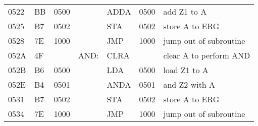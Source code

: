 \documentclass{CInf_practice}
\begin{document}
\begin{tabularx}{\textwidth}{|L||L|L|L||L|R|X|}
0522 & BB & 0500 &       & ADDA & 0500 & add Z1 to A                         \\
0525 & B7 & 0502 &       & STA  & 0502 & store A to ERG                      \\
0528 & 7E & 1000 &       & JMP  & 1000 & jump out of subroutine              \\
052A & 4F &      & AND:  & CLRA &      & clear A to perform AND              \\
052B & B6 & 0500 &       & LDA  & 0500 & load Z1 to A                        \\
052E & B4 & 0501 &       & ANDA & 0501 & and Z2 with A                       \\
0531 & B7 & 0502 &       & STA  & 0502 & store A to ERG                      \\
0534 & 7E & 1000 &       & JMP  & 1000 & jump out of subroutine              \\\hline
\end{tabularx}






   \newcommand*\circled[1]{\tikz[baseline=(char.base)]{\node[font=\small,minimum
   size=3ex,left=8pt,below=8pt,shape=circle, draw,inner sep=1pt] (char) {#1};}}
\end{document}
